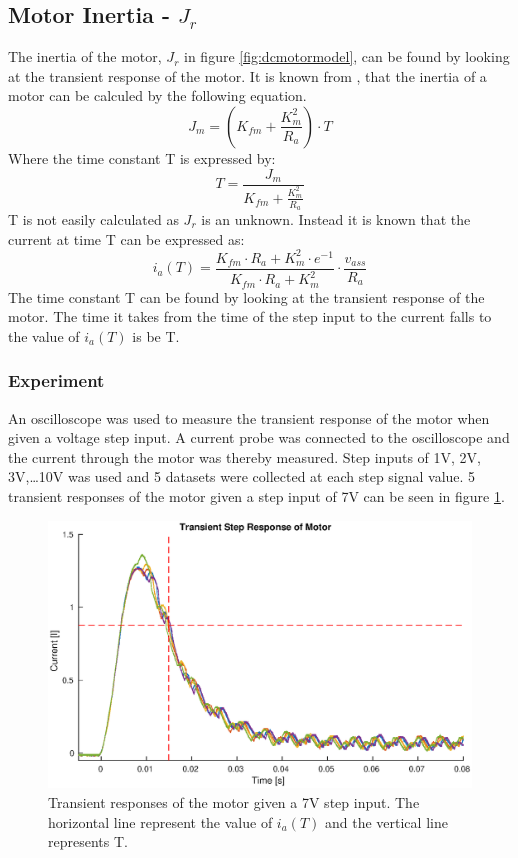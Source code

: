 \subsection{Motor Inertia - $J_r$}
The inertia of the motor, $J_r$ in figure \ref{fig:dcmotormodel}, can be found by looking at the transient response of the motor. 
It is known from \cite{feedback}, that the inertia of a motor can be calculed by the following equation.
$$J_m = (K_{fm}+\frac{K_m^2}{R_a}) \cdot T$$
Where the time constant T is expressed by:
$$ T = \frac{J_m}{K_{fm}+\frac{K_m^2}{R_a}}$$
T is not easily calculated as $J_r$ is an unknown. Instead it is known that the current at time T can be expressed as:
$$ i_a(T) = \frac{K_{fm} \cdot R_a + K_m^2 \cdot e^{-1}}{K_{fm} \cdot R_a + K_m^2} \cdot \frac{v_{ass}}{R_a} $$
The time constant T can be found by looking at the transient response of the motor. 
The time it takes from the time of the step input to the current falls to the value of $i_a(T)$ is be T.

\subsubsection{Experiment}
An oscilloscope was used to measure the transient response of the motor when given a voltage step input. A current probe was connected to the oscilloscope and the current through the motor was thereby measured.
Step inputs of 1V, 2V, 3V,\dots 10V was used and 5 datasets were collected at each step signal value.  
5 transient responses of the motor given a step input of 7V can be seen in figure \ref{fig:inertia_trans_plot}.

\begin{figure}[!h]
	\centering
	\includegraphics[width=\linewidth]{graphics/transient_response_inertia}
	\caption{Transient responses of the motor given a 7V step input. The horizontal line represent the value of $i_a(T)$ and the vertical line represents T.}
	\label{fig:inertia_trans_plot}
\end{figure}

